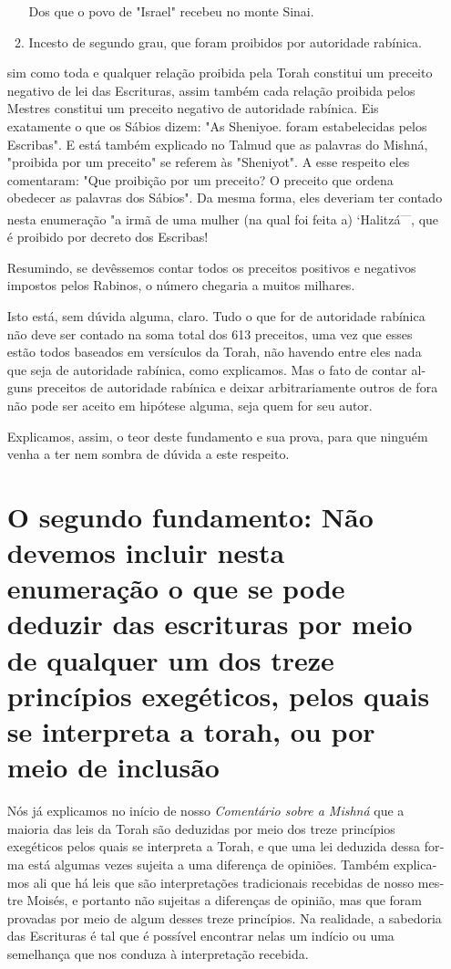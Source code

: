 \begin{itemize}
\begin{enumrate}
\begin{enumerate}
 Dos que o povo de "Israel" recebeu no monte Sinai.
 
\item
 
 Incesto de segundo grau, que foram proibidos por autoridade rabínica.
 
\end{enumerate}


sim como toda e qualquer relação proibida pela Torah constitui um
preceito negativo de lei das Escrituras, assim também cada relação
proibida pelos Mes­tres constitui um preceito negativo de autoridade
rabínica. Eis exatamente o que os Sábios dizem: "As
Sheniyoe. foram estabelecidas pelos Escribas". E es­tá
também explicado no Talmud que as palavras do Mishná, "proibida por um
preceito" se referem às "Sheniyot". A esse respeito eles comentaram:
"Que proi­bição por um preceito? O preceito que ordena obedecer as
palavras dos Sá­bios". Da mesma forma, eles deveriam ter contado nesta
enumeração "a irmã de uma mulher (na qual foi feita a)
`Halitzá\textsuperscript{---}, que é proibido por decreto dos Escribas!

Resumindo, se devêssemos contar todos os preceitos positivos e
ne­gativos impostos pelos Rabinos, o número chegaria a muitos milhares.

Isto está, sem dúvida alguma, claro. Tudo o que for de autoridade
rabínica não deve ser contado na soma total dos 613 preceitos, uma vez
que esses estão todos baseados em versículos da Torah, não havendo entre
eles na­da que seja de autoridade rabínica, como explicamos. Mas o fato
de contar al­guns preceitos de autoridade rabínica e deixar
arbitrariamente outros de fora não pode ser aceito em hipótese alguma,
seja quem for seu autor.

Explicamos, assim, o teor deste fundamento e sua prova, para que ninguém
venha a ter nem sombra de dúvida a este respeito.

\chapter{O segundo fundamento:
Não devemos incluir nesta enumeração o que se pode deduzir das
escrituras por meio de qualquer um dos treze princípios exegéticos,
pelos quais se interpreta a torah,
ou por meio de inclusão}

Nós já explicamos no início de nosso \emph{Comentário sobre a Mishná}
que a maioria das leis da Torah são deduzidas por meio dos treze
princípios exegéticos pelos quais se interpreta a Torah, e que uma lei
deduzida dessa for­ma está algumas vezes sujeita a uma diferença de
opiniões. Também explica­mos ali que há leis que são interpretações
tradicionais recebidas de nosso mes­tre Moisés, e portanto não sujeitas
a diferenças de opinião, mas que foram pro­vadas por meio de algum
desses treze princípios. Na realidade, a sabedoria das Escrituras é tal
que é possível encontrar nelas um indício ou uma semelhança que nos
conduza à interpretação recebida.


\end{enumrate}
\end{itemize}
